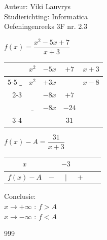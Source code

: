 \documentclass[a4paper]{article}
\begin{document}
  
\noindent \large Auteur: Viki Lauvrys        \\
\noindent \large Studierichting: Informatica \\
\noindent \large Oefeningenreeks 3F nr. 2.3 \\

\medskip

\normalsize

$ f(x) = \dfrac{x^2 -5x +7}{x+3} $ \\

\bigskip

\begin{tabular}{rccc|l}
     & $x^2$ & $-5x$  & $+7$         & $x+3$  \\ \cline{5-5} 
$\_$ & $x^2$ & $+3x$ &              & $x-8$ \\ \cline{2-3}
     &          & $-8x$  & $+7$         &        \\
     & $\_$     & $-8x$  & $-24$         &        \\ \cline{3-4}
     &          &       & $31$          &        \\ 
\end{tabular}

\bigskip

$ f(x) - A = \dfrac{31}{x + 3}$ \\

\bigskip

\begin{tabular}{c|ccccc}
$x$				 &     & $-3$ &     & \\ \hline
$f(x) - A$ & $-$ & $|$ & $+$ & \\
\end{tabular}

\bigskip

Conclusie: \\

$ x \rightarrow +\infty $ : $ f > A $ \\ 

$ x \rightarrow -\infty $ : $ f < A $ \\

\begin{thebibliography}{999}
\end{thebibliography}
\end{document}
